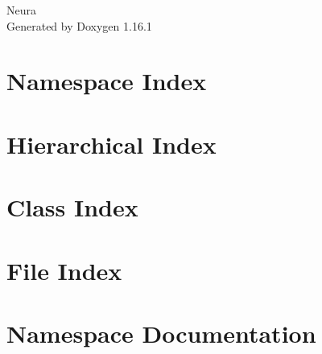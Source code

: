 \documentclass[twoside]{book}
\newcommand{\+}{\discretionary{\mbox{\scriptsize$\hookleftarrow$}}{}{}}
\newcommand{\clearemptydoublepage}{%
    \newpage{\pagestyle{empty}\cleardoublepage}%
  }
\begin{document}
  \raggedbottom
    \hypersetup{pageanchor=false,
                bookmarksnumbered=true,
                pdfencoding=unicode
               }
  \begin{titlepage}
  \vspace*{7cm}
  \begin{center}%
  {\Large Neura}\\
  \vspace*{1cm}
  {\large Generated by Doxygen 1.16.1}\\
  \end{center}
  \end{titlepage}
  \clearemptydoublepage
  \tableofcontents
  \clearemptydoublepage
  \hypersetup{pageanchor=true}


\chapter{Namespace Index}

\chapter{Hierarchical Index}

\chapter{Class Index}

\chapter{File Index}

\chapter{Namespace Documentation}



\end{document}
